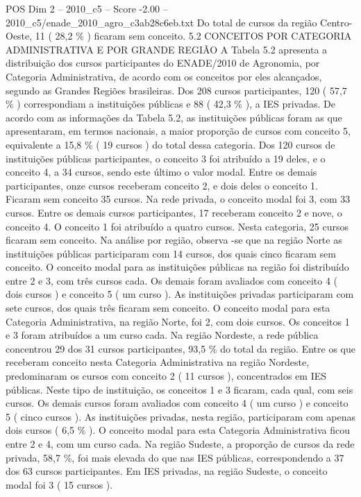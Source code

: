 \begin{textsample}{POS Dim 2 – 2010\_c5 – Score -2.00 – 2010\_c5/enade\_2010\_agro\_c3ab28c6eb.txt}
Do total de cursos da região Centro-Oeste, 11 ( 28,2 \% ) ficaram sem conceito. 5.2 CONCEITOS POR CATEGORIA ADMINISTRATIVA E POR GRANDE REGIÃO A Tabela 5.2 apresenta a distribuição dos cursos participantes do ENADE/2010 de Agronomia, por Categoria Administrativa, de acordo com os conceitos por eles alcançados, segundo as Grandes Regiões brasileiras.
Dos 208 cursos participantes, 120 ( 57,7 \% ) correspondiam a instituições públicas e 88 ( 42,3 \% ), a IES privadas.
De acordo com as informações da Tabela 5.2, as instituições públicas foram as que apresentaram, em termos nacionais, a maior proporção de cursos com conceito 5, equivalente a 15,8 \% ( 19 cursos ) do total dessa categoria.
Dos 120 cursos de instituições públicas participantes, o conceito 3 foi atribuído a 19 deles, e o conceito 4, a 34 cursos, sendo este último o valor modal.
Entre os demais participantes, onze cursos receberam conceito 2, e dois deles o conceito 1.
Ficaram sem conceito 35 cursos.
Na rede privada, o conceito modal foi 3, com 33 cursos.
Entre os demais cursos participantes, 17 receberam conceito 2 e nove, o conceito 4.
O conceito 1 foi atribuído a quatro cursos.
Nesta categoria, 25 cursos ficaram sem conceito.
Na análise por região, observa -se que na região Norte as instituições públicas participaram com 14 cursos, dos quais cinco ficaram sem conceito.
O conceito modal para as instituições públicas na região foi distribuído entre 2 e 3, com três cursos cada.
Os demais foram avaliados com conceito 4 ( dois cursos ) e conceito 5 ( um curso ).
As instituições privadas participaram com sete cursos, dos quais três ficaram sem conceito.
O conceito modal para esta Categoria Administrativa, na região Norte, foi 2, com dois cursos.
Os conceitos 1 e 3 foram atribuídos a um curso cada.
Na região Nordeste, a rede pública concentrou 29 dos 31 cursos participantes, 93,5 \% do total da região.
Entre os que receberam conceito nesta Categoria Administrativa na região Nordeste, predominaram os cursos com conceito 2 ( 11 cursos ), concentrados em IES públicas.
Neste tipo de instituição, os conceitos 1 e 3 ficaram, cada qual, com seis cursos.
Os demais cursos foram avaliados com conceito 4 ( um curso ) e conceito 5 ( cinco cursos ).
As instituições privadas, nesta região, participaram com apenas dois cursos ( 6,5 \% ).
O conceito modal para esta Categoria Administrativa ficou entre 2 e 4, com um curso cada.
Na região Sudeste, a proporção de cursos da rede privada, 58,7 \%, foi mais elevada do que nas IES públicas, correspondendo a 37 dos 63 cursos participantes.
Em IES privadas, na região Sudeste, o conceito modal foi 3 ( 15 cursos ).

\end{textsample}
